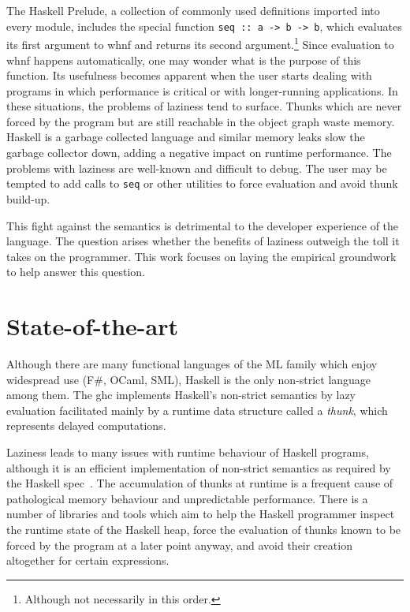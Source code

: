 \documentclass[thesis=B,english]{FITthesis}[2019/12/23]
\newcommand{\hsSignature}[1]{\hsCode{#1}}
\newcommand{\hsIdent}[1]{\texttt{#1}}
\newcommand{\hsCode}[1]{\texttt{#1}}
\begin{document}
The Haskell Prelude, a collection of commonly used definitions imported into
every module, includes the special function \hsSignature{seq :: a -> b -> b},
which evaluates its first argument to \acrshort{whnf} and returns its second
argument.\footnote{Although not necessarily in this order.} Since evaluation to
\acrshort{whnf} happens automatically, one may wonder what is the purpose of
this function. Its usefulness becomes apparent when the user starts dealing
with programs in which performance is critical or with longer-running
applications. In these situations, the problems of laziness tend to surface.
Thunks which are never forced by the program but are still reachable in the
object graph waste memory. Haskell is a garbage collected language and similar
memory leaks slow the garbage collector down, adding a negative impact on
runtime performance. The problems with laziness are well-known and difficult to
debug. The user may be tempted to add calls to \hsIdent{seq} or other utilities
to force evaluation and avoid thunk build-up.

This fight against the semantics is detrimental to the developer experience of
the language. The question arises whether the benefits of laziness outweigh the
toll it takes on the programmer. This work focuses on laying the empirical
groundwork to help answer this question.


\chapter{State-of-the-art} \label{sec:state-of-the-art}
Although there are many functional languages of the ML family which enjoy
widespread use (F\#, OCaml, SML), Haskell is the only non-strict language among
them. The \acrfull{ghc} implements Haskell's non-strict semantics by lazy
evaluation facilitated mainly by a runtime data structure called a
\textit{thunk}, which represents delayed computations.

Laziness leads to many issues with runtime behaviour of Haskell programs,
although it is an efficient implementation of non-strict semantics as required
by the Haskell spec~\cite{haskell2010}. The accumulation of thunks at runtime is
a frequent cause of pathological memory behaviour and unpredictable
performance. There is a number of libraries and tools which aim to help the
Haskell programmer inspect the runtime state of the Haskell heap, force the
evaluation of thunks known to be forced by the program at a later point anyway,
and avoid their creation altogether for certain expressions.
\end{document}
